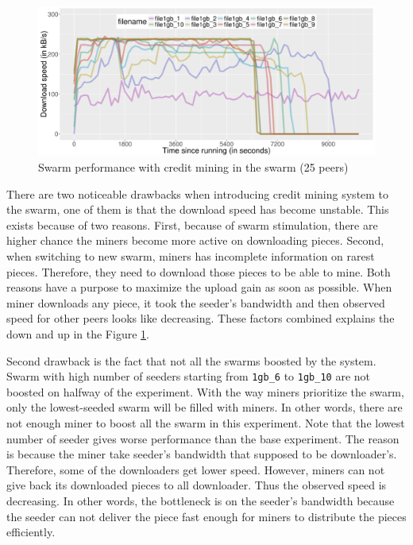\begin{figure}[h!]
	\centering
	\includegraphics[width=\textwidth]{pics/results/swperf_sc2_25.png}
	\caption{Swarm performance with credit mining in the swarm (25 peers)}
	\label{fig:swarmcm25perf}
\end{figure}

There are two noticeable drawbacks when introducing credit mining system to the swarm, one of them is that the download speed has become unstable. This exists because of two reasons. First, because of swarm stimulation, there are higher chance the miners become more active on downloading pieces. Second, when switching to new swarm, miners has incomplete information on rarest pieces. Therefore, they need to download those pieces to be able to mine. Both reasons have a purpose to maximize the upload gain as soon as possible. When miner downloads any piece, it took the seeder's bandwidth and then observed speed for other peers looks like decreasing. These factors combined explains the down and up in the Figure \ref{fig:swarmcm25perf}.

Second drawback is the fact that not all the swarms boosted by the system. Swarm with high number of seeders starting from \texttt{1gb\_6} to \texttt{1gb\_10} are not boosted on halfway of the experiment. With the way miners prioritize the swarm, only the lowest-seeded swarm will be filled with miners. In other words, there are not enough miner to boost all the swarm in this experiment. Note that the lowest number of seeder gives worse performance than the base experiment. The reason is because the miner take seeder's bandwidth that supposed to be downloader's. Therefore, some of the downloaders get lower speed. However, miners can not give back its downloaded pieces to all downloader. Thus the observed speed is decreasing. In other words, the bottleneck is on the seeder's bandwidth because the seeder can not deliver the piece fast enough for miners to distribute the pieces efficiently.

